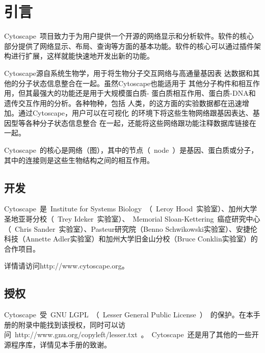 \chapter*{引言}
Cytoscape~项目致力于为用户提供一个开源的网络显示和分析软件。软件的核心部分提供了网络显示、布局、查询等方面的基本功能。软件的核心可以通过插件架构进行扩展，这样就能快速地开发出新的功能。

Cytoscape源自系统生物学，用于将生物分子交互网络与高通量基因表
达数据和其他的分子状态信息整合在一起。虽然Cytoscape也能适用于
其他分子构件和相互作用，但其最强大的功能还是用于大规模蛋白质-
蛋白质相互作用、蛋白质-DNA和遗传交互作用的分析。各种物种，包括
人类，的这方面的实验数据都在迅速增加。通过Cytoscape，用户可以在可视化
的环境下将这些生物网络跟基因表达、基因型等各种分子状态信息整合
在一起，还能将这些网络跟功能注释数据库链接在一起。

Cytoscape~的核心是网络（图），其中的节点（~node~）是基因、蛋白质或分子，其中的连接则是这些生物结构之间的相互作用。

\section{开发}

Cytoscape~是~Institute for Systems Biology~（~Leroy Hood~实验室）、加州大学圣地亚哥分校（~Trey Ideker~实验室）、~Memorial Sloan-Kettering~癌症研究中心（~Chris Sander~实验室）、Pasteur研究院（Benno Schwikowski实验室）、安捷伦科技（Annette Adler实验室）和加州大学旧金山分校（Bruce Conklin实验室）的合作项目。

详情请访问http://www.cytoscape.org。

\section{授权}
Cytoscape~受~GNU LGPL~（~Lesser General Public License~）~的保护。在本手册的附录中能找到该授权，同时可以访问~http://www.gnu.org/copyleft/lesser.txt~。~Cytoscape~还是用了其他的一些开源程序库，详情见本手册的致谢。

